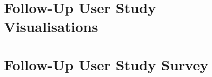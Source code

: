 \begin{center}
\end{center}


\chapter{Follow-Up User Study Visualisations}
\label{appendix:follow-up-user-study-visualisations}


\chapter{Follow-Up User Study Survey}
\label{appendix:follow-up-user-study-survey}

\clearpage

